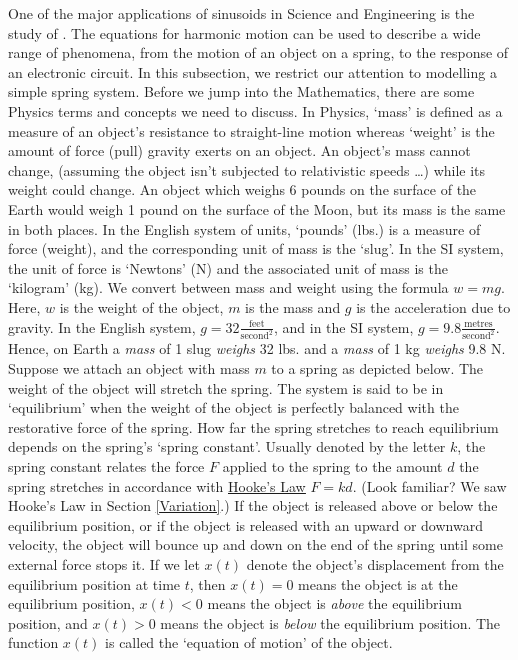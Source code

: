 One of the major applications of sinusoids in Science and Engineering is the study of  .   The equations for harmonic motion can be used to describe a wide range of phenomena, from the motion of an object on a spring, to the response of an electronic circuit.  In this subsection, we restrict our attention to modelling a simple spring system.  Before we jump into the Mathematics, there are some Physics terms and concepts we need to discuss.  In Physics, `mass' is defined as a measure of an object's resistance to straight-line motion whereas `weight' is the amount of force (pull) gravity exerts on an object.  An object's mass cannot change, (assuming the object isn't subjected to relativistic speeds \dots) while its weight could change.  An object which weighs 6 pounds on the surface of the Earth would weigh 1 pound on the surface of the Moon, but its mass is the same in both places. In the English system of units, `pounds' (lbs.) is a measure of force (weight), and the corresponding unit of mass is the `slug'. In the SI system, the unit of force is `Newtons' (N) and the associated unit of mass is the `kilogram' (kg). We convert between mass and weight using the formula $w = mg$.   Here, $w$ is the weight of the object, $m$ is the mass and $g$ is the acceleration due to gravity.  In the English system, $g = 32 \frac{\text{feet}}{\text{second}^2}$, and in the SI system, $g = 9.8\frac{\text{metres}}{\text{second}^2}$. Hence, on Earth a \textit{mass} of 1 slug \textit{weighs} 32 lbs. and a \textit{mass} of 1 kg \textit{weighs} 9.8 N.   Suppose we attach an object with mass $m$ to a spring as depicted below. The weight of the object will stretch the spring.   The system is said to be in `equilibrium' when the weight of the object is perfectly balanced with the restorative force of the spring.  How far the spring stretches to reach equilibrium depends on the spring's `spring constant'. Usually denoted by the letter $k$, the spring constant relates the force $F$ applied to the spring to the amount $d$ the spring stretches in accordance with \href{http://en.wikipedia.org/wiki/Hooke's_law}{\underline{Hooke's Law}} $F = kd$. (Look familiar?  We saw Hooke's Law in Section \ref{Variation}.) If the object is released above or below the equilibrium position, or if the object is released with an upward or downward velocity, the object will bounce up and down on the end of the spring until some external force stops it.  If we let $x(t)$ denote the object's displacement from the equilibrium position at time $t$, then $x(t) = 0$ means the object is at the equilibrium position, $x(t) < 0$ means the object is \textit{above} the equilibrium position, and $x(t) > 0$ means the object is \textit{below} the equilibrium position.  The function $x(t)$ is called the `equation of motion' of the object.




